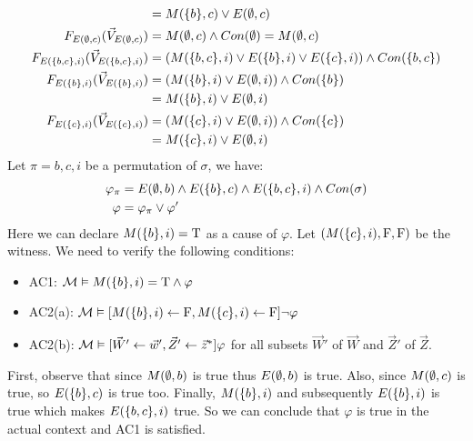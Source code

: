 \begin{example}
\begin{align*}
                         & = M(\{b\},c) \vee E(\emptyset,c)                        \\
        F_{E(\emptyset,c)}(\vec V_{E(\emptyset,c)})      & = M(\emptyset,c) \wedge Con(\emptyset)  = M(\emptyset,c)              \\
        F_{E(\{b,c\},i)}(\vec V_{E(\{b,c\},i)}) & = (M(\{b,c\},i) \vee E(\{b\},i) \vee E(\{c\},i))
        \wedge Con(\{b,c\})                                                 \\
        F_{E(\{b\},i)}(\vec V_{E(\{b\},i)})   & = (M(\{b\},i) \vee E(\emptyset,i))\wedge Con(\{b\})     \\
                         & = M(\{b\},i) \vee E(\emptyset,i)                        \\
        F_{E(\{c\},i)}(\vec V_{E(\{c\},i)})   & = (M(\{c\},i) \vee E(\emptyset,i))\wedge Con(\{c\})     \\
                         & = M(\{c\},i) \vee E(\emptyset,i)                        \\
    \end{align*}
    Let $\pi = b,c,i$ be a permutation of $\sigma$, we have:
    \begin{align*}
        \varphi_{\pi} & =
        E(\emptyset,b) \wedge E(\{b\},c) \wedge E(\{b,c\},i)
        \wedge Con(\sigma)                            \\
        \varphi       & = \varphi_{\pi} \vee \varphi'
    \end{align*}
    Here we can declare $M(\{b\},i) = \mathrm{T}$ as a cause of $\varphi$.
    Let $(M(\{c\},i),\mathrm{F},\mathrm{F})$ be the witness.
    We need to verify the following conditions:
    \begin{itemize}
        \item AC1:  $\mathcal{M} \vDash M(\{b\},i) = \mathrm{T} \wedge \varphi$
        \item AC2(a): $\mathcal{M}\vDash [M(\{b\},i)\leftarrow \mathrm{F},M(\{c\},i)\leftarrow \mathrm{F}] \neg \varphi$
        \item AC2(b): $\mathcal{M} \vDash [\vec W' \leftarrow \vec w', \vec Z' \leftarrow \vec z^* ]\varphi$
              for all subsets
              $\vec W'$ of $\vec W$ and $\vec Z'$ of $\vec Z$.
    \end{itemize}
    First, observe that since $M(\emptyset,b)$ is true thus $E(\emptyset,b)$ is true.
    Also, since $M(\emptyset,c)$ is true, so $E(\{b\},c)$ is true too.
    Finally, $M(\{b\},i)$ and subsequently $E(\{b\},i)$ is true which makes
    $E(\{b,c\},i)$ true.
    So we can conclude that $\varphi$ is true in the actual context and
    AC1 is satisfied.


\end{example}
